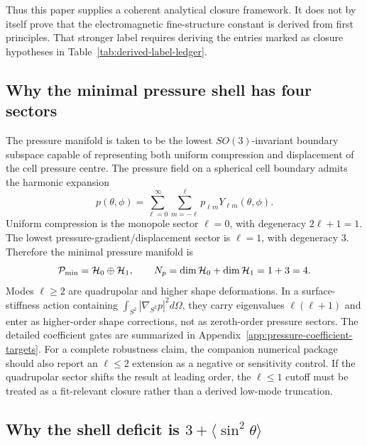 \documentclass[11pt]{article}
\begin{document}
Thus this paper supplies a coherent analytical closure framework.  It does not
by itself prove that the electromagnetic fine-structure constant is derived
from first principles.  That stronger label requires deriving the entries
marked as closure hypotheses in Table~\ref{tab:derived-label-ledger}.


\subsection{Why the minimal pressure shell has four sectors}
\label{subsec:why-four-pressure-sectors}

The pressure manifold is taken to be the lowest \(SO(3)\)-invariant boundary
subspace capable of representing both uniform compression and displacement of
the cell pressure centre.  The pressure field on a spherical cell boundary
admits the harmonic expansion
\[
  p(\theta,\phi)
  =
  \sum_{\ell=0}^{\infty}\sum_{m=-\ell}^{\ell}
  p_{\ell m}Y_{\ell m}(\theta,\phi).
\]
Uniform compression is the monopole sector \(\ell=0\), with degeneracy
\(2\ell+1=1\).  The lowest pressure-gradient/displacement sector is
\(\ell=1\), with degeneracy \(3\).  Therefore the minimal pressure manifold is
\[
  \mathcal P_{\rm min}
  =
  \mathcal H_0\oplus\mathcal H_1,
  \qquad
  N_p=\dim\mathcal H_0+\dim\mathcal H_1=1+3=4.
\]
Modes \(\ell\ge2\) are quadrupolar and higher shape deformations.  In a
surface-stiffness action containing \(\int_{S^2}|\nabla_{S^2}p|^2d\Omega\),
they carry eigenvalues \(\ell(\ell+1)\) and enter as higher-order shape
corrections, not as zeroth-order pressure sectors.  The detailed coefficient
gates are summarized in Appendix~\ref{app:pressure-coefficient-targets}.
For a complete robustness claim, the companion numerical package should also
report an \(\ell\le2\) extension as a negative or sensitivity control.  If the
quadrupolar sector shifts the result at leading order, the \(\ell\le1\) cutoff
must be treated as a fit-relevant closure rather than a derived low-mode
truncation.

\subsection{Why the shell deficit is \(3+\langle\sin^2\theta\rangle\)}
\label{subsec:why-shell-deficit}
\end{document}
